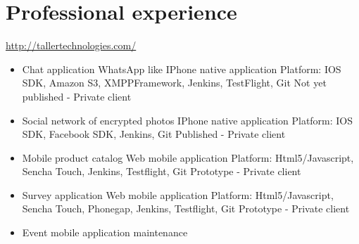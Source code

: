 \documentclass[11pt,a4paper]{moderncv}
\begin{document}
\section{Professional experience}
{
    \url{http://tallertechnologies.com/}
    \begin{itemize}
        \item Chat application WhatsApp like
            \newline{}
            IPhone native application
            \newline{}
            Platform: IOS SDK, Amazon S3, XMPPFramework, Jenkins, TestFlight, Git
            \newline{}
            Not yet published - Private client
            \newline{}
        \item Social network of encrypted photos
            \newline{}
            IPhone native application
            \newline{}
            Platform: IOS SDK, Facebook SDK, Jenkins, Git
            \newline{}
            Published - Private client
            \newline{}
        \item Mobile product catalog
            \newline{}
            Web mobile application
            \newline{}
            Platform: Html5/Javascript, Sencha Touch, Jenkins, Testflight, Git
            \newline{}
            Prototype - Private client
            \newline{}
        \item Survey application
            \newline{}
            Web mobile application
            \newline{}
            Platform: Html5/Javascript, Sencha Touch, Phonegap, Jenkins, Testflight, Git
            \newline{}
            Prototype - Private client
            \newline{}
        \item Event mobile application maintenance
            \newline{}

\end{itemize}}
\end{document}
